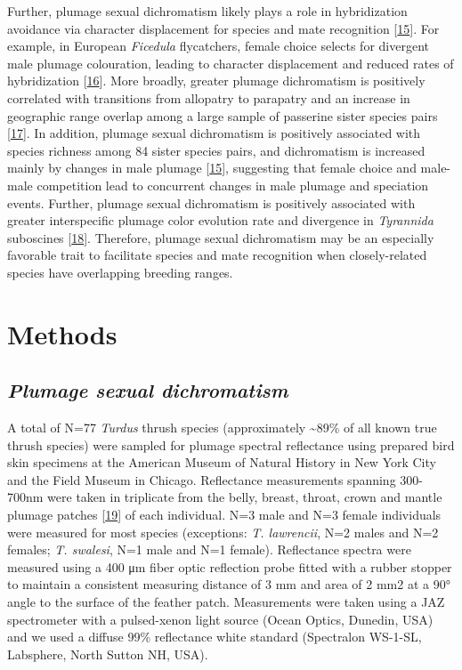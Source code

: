 \documentclass[
  a4paper,
]{article}
\begin{document}
Further, plumage sexual dichromatism likely plays a role in
hybridization avoidance via character displacement for species and mate
recognition {[}\protect\hyperlink{ref-seddon2013}{15}{]}. For example,
in European \emph{Ficedula} flycatchers, female choice selects for
divergent male plumage colouration, leading to character displacement
and reduced rates of hybridization
{[}\protect\hyperlink{ref-stre1997}{16}{]}. More broadly, greater
plumage dichromatism is positively correlated with transitions from
allopatry to parapatry and an increase in geographic range overlap among
a large sample of passerine sister species pairs
{[}\protect\hyperlink{ref-cooney2017}{17}{]}. In addition, plumage
sexual dichromatism is positively associated with species richness among
84 sister species pairs, and dichromatism is increased mainly by changes
in male plumage {[}\protect\hyperlink{ref-seddon2013}{15}{]}, suggesting
that female choice and male-male competition lead to concurrent changes
in male plumage and speciation events. Further, plumage sexual
dichromatism is positively associated with greater interspecific plumage
color evolution rate and divergence in \emph{Tyrannida} suboscines
{[}\protect\hyperlink{ref-cooney2019}{18}{]}. Therefore, plumage sexual
dichromatism may be an especially favorable trait to facilitate species
and mate recognition when closely-related species have overlapping
breeding ranges.

\hypertarget{methods}{%
\section{Methods}\label{methods}}

\hypertarget{plumage-sexual-dichromatism}{%
\subsection{\texorpdfstring{\emph{Plumage sexual
dichromatism}}{Plumage sexual dichromatism}}\label{plumage-sexual-dichromatism}}

A total of N=77 \emph{Turdus} thrush species (approximately
\textasciitilde89\% of all known true thrush species) were sampled for
plumage spectral reflectance using prepared bird skin specimens at the
American Museum of Natural History in New York City and the Field Museum
in Chicago. Reflectance measurements spanning 300-700nm were taken in
triplicate from the belly, breast, throat, crown and mantle plumage
patches {[}\protect\hyperlink{ref-andersson2006}{19}{]} of each
individual. N=3 male and N=3 female individuals were measured for most
species (exceptions: \emph{T. lawrencii}, N=2 males and N=2 females;
\emph{T. swalesi}, N=1 male and N=1 female). Reflectance spectra were
measured using a 400 μm fiber optic reflection probe fitted with a
rubber stopper to maintain a consistent measuring distance of 3 mm and
area of 2 mm2 at a 90° angle to the surface of the feather patch.
Measurements were taken using a JAZ spectrometer with a pulsed-xenon
light source (Ocean Optics, Dunedin, USA) and we used a diffuse 99\%
reflectance white standard (Spectralon WS-1-SL, Labsphere, North Sutton
NH, USA).
\end{document}

